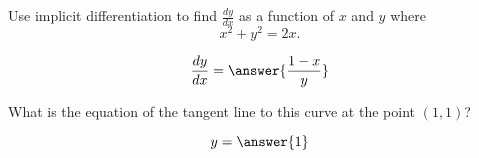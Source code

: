 \documentclass{ximera}
\author{Steven Gubkin}
\begin{document}
\begin{exercise}

Use implicit differentiation to find $\frac{dy}{dx}$ as a function of $x$ and $y$ where
\[
x^2+y^2 = 2x.
\]
\begin{prompt}
\[
\frac{dy}{dx} = \answer{\frac{1-x}{y}}
\]
\end{prompt}
What is the equation of the tangent line to this curve at the point $(1,1)$?
\begin{prompt}
\[
y = \answer{1}
\]
\end{prompt}
\end{exercise}
\end{document}
